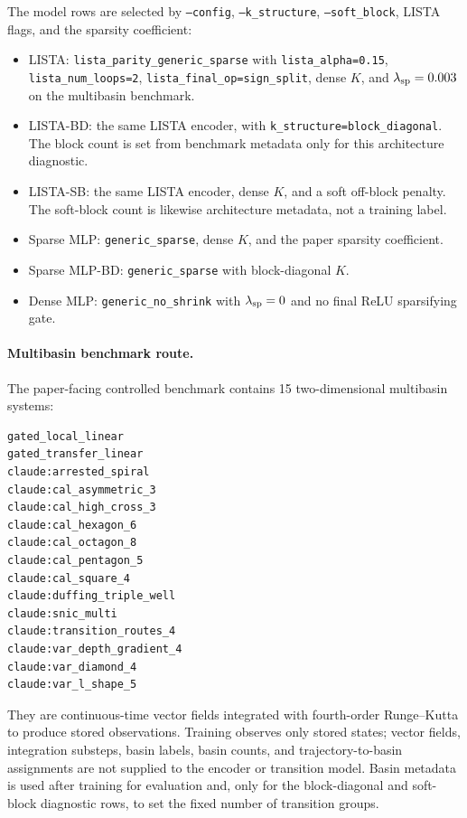 The model rows are selected by \texttt{--config}, \texttt{--k\_structure},
\texttt{--soft\_block}, LISTA flags, and the sparsity coefficient:
\begin{itemize}
  \item LISTA: \texttt{lista\_parity\_generic\_sparse} with
  \texttt{lista\_alpha=0.15}, \texttt{lista\_num\_loops=2},
  \texttt{lista\_final\_op=sign\_split}, dense \(K\), and
  \(\lambda_{\rm sp}=0.003\) on the multibasin benchmark.
  \item LISTA-BD: the same LISTA encoder, with
  \texttt{k\_structure=block\_diagonal}. The block count is set from benchmark
  metadata only for this architecture diagnostic.
  \item LISTA-SB: the same LISTA encoder, dense \(K\), and a soft off-block
  penalty. The soft-block count is likewise architecture metadata, not a
  training label.
  \item Sparse MLP: \texttt{generic\_sparse}, dense \(K\), and the paper
  sparsity coefficient.
  \item Sparse MLP-BD: \texttt{generic\_sparse} with block-diagonal \(K\).
  \item Dense MLP: \texttt{generic\_no\_shrink} with \(\lambda_{\rm sp}=0\)
  and no final ReLU sparsifying gate.
\end{itemize}

\paragraph{Multibasin benchmark route.}
The paper-facing controlled benchmark contains 15 two-dimensional multibasin
systems:
\begin{verbatim}
gated_local_linear
gated_transfer_linear
claude:arrested_spiral
claude:cal_asymmetric_3
claude:cal_high_cross_3
claude:cal_hexagon_6
claude:cal_octagon_8
claude:cal_pentagon_5
claude:cal_square_4
claude:duffing_triple_well
claude:snic_multi
claude:transition_routes_4
claude:var_depth_gradient_4
claude:var_diamond_4
claude:var_l_shape_5
\end{verbatim}

They are continuous-time vector fields integrated with fourth-order Runge--Kutta
to produce stored observations. Training observes only stored states; vector
fields, integration substeps, basin labels, basin counts, and trajectory-to-basin
assignments are not supplied to the encoder or transition model. Basin metadata
is used after training for evaluation and, only for the block-diagonal and
soft-block diagnostic rows, to set the fixed number of transition groups.

